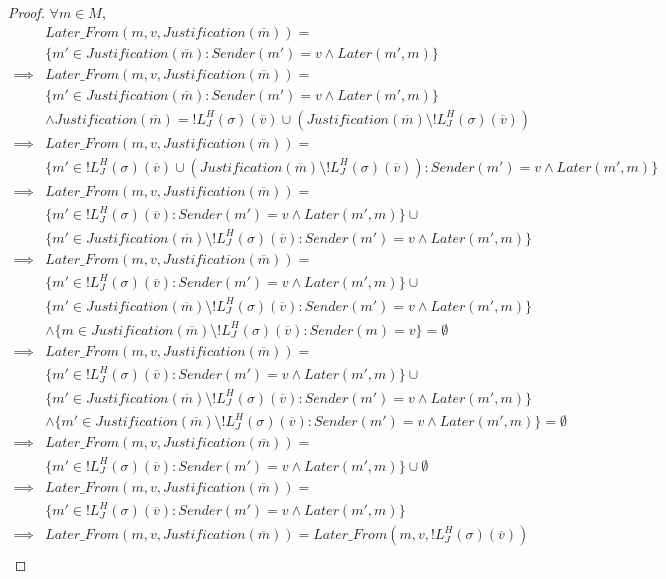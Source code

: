 \begin{proof}
$\forall m \in M$,
\begin{align}
          &Later\_From(m,v,Justification(\overline{m})) = \\
          &\{m' \in Justification(\overline{m}) : Sender(m') = v \land Later(m', m)\} \\
  \implies&Later\_From(m,v,Justification(\overline{m})) = \\
          &\{m' \in Justification(\overline{m}) : Sender(m') = v \land Later(m', m)\} \\
          &\land Justification(\overline{m}) = !L^H_J(\sigma)(\overline{v}) \cup (Justification(\overline{m}) \setminus !L^H_J(\sigma)(\overline{v})) \\
  \implies&Later\_From(m,v,Justification(\overline{m})) = \\
          &\{m' \in !L^H_J(\sigma)(\overline{v}) \cup (Justification(\overline{m}) \setminus !L^H_J(\sigma)(\overline{v})) : Sender(m') = v \land Later(m', m)\} \\
  \implies&Later\_From(m,v,Justification(\overline{m})) = \\
          &\{m' \in !L^H_J(\sigma)(\overline{v}) : Sender(m') = v \land Later(m', m)\} \cup \\
          &\{m' \in Justification(\overline{m}) \setminus !L^H_J(\sigma)(\overline{v}): Sender(m') = v \land Later(m', m)\} \\
  \implies&Later\_From(m,v,Justification(\overline{m})) = \\
          &\{m' \in !L^H_J(\sigma)(\overline{v}) : Sender(m') = v \land Later(m', m)\} \cup \\
          &\{m' \in Justification(\overline{m}) \setminus !L^H_J(\sigma)(\overline{v}): Sender(m') = v \land Later(m', m)\} \\
          &\land \{ m \in Justification(\overline{m}) \setminus !L^H_J(\sigma)(\overline{v}): Sender(m) = v \} = \emptyset \\
  \implies&Later\_From(m,v,Justification(\overline{m})) = \\
          &\{m' \in !L^H_J(\sigma)(\overline{v}) : Sender(m') = v \land Later(m', m)\} \cup \\
          &\{m' \in Justification(\overline{m}) \setminus !L^H_J(\sigma)(\overline{v}): Sender(m') = v \land Later(m', m)\} \\
          &\land \{m' \in Justification(\overline{m}) \setminus !L^H_J(\sigma)(\overline{v}): Sender(m') = v \land Later(m', m)\} = \emptyset \\
  \implies&Later\_From(m,v,Justification(\overline{m})) = \\
          &\{m' \in !L^H_J(\sigma)(\overline{v}) : Sender(m') = v \land Later(m', m)\} \cup \emptyset \\
  \implies&Later\_From(m,v,Justification(\overline{m})) = \\
          &\{m' \in !L^H_J(\sigma)(\overline{v}) : Sender(m') = v \land Later(m', m)\} \\
  \implies&Later\_From(m,v,Justification(\overline{m})) = Later\_From(m,v,!L^H_J(\sigma)(\overline{v})) \\
\end{align}


\end{proof}
